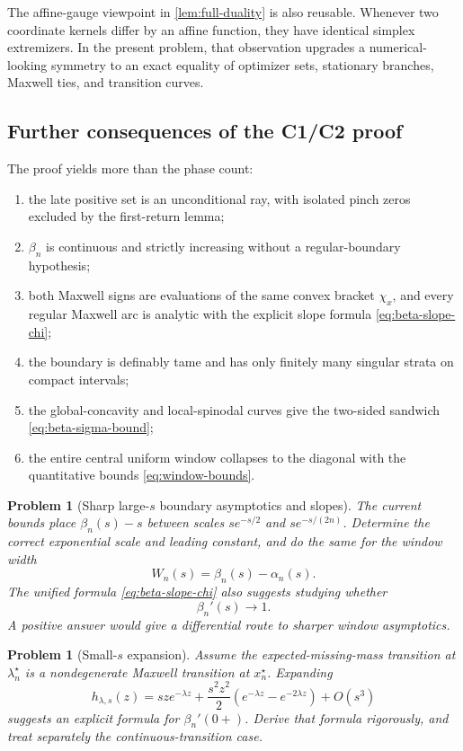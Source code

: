 \documentclass[11pt]{article}
\theoremstyle{plain}
\newtheorem{problem}[theorem]{Problem}
\theoremstyle{definition}
\theoremstyle{remark}
\begin{document}
The affine-gauge viewpoint in \cref{lem:full-duality} is also reusable.  Whenever two coordinate kernels differ by an affine function, they have identical simplex extremizers.  In the present problem, that observation upgrades a numerical-looking symmetry to an exact equality of optimizer sets, stationary branches, Maxwell ties, and transition curves.

\subsection{Further consequences of the C1/C2 proof}

The proof yields more than the phase count:
\begin{enumerate}[label=\textup{(\roman*)}]
\item the late positive set is an unconditional ray, with isolated pinch zeros excluded by the first-return lemma;
\item \(\beta_n\) is continuous and strictly increasing without a regular-boundary hypothesis;
\item both Maxwell signs are evaluations of the same convex bracket \(\chi_x\), and every regular Maxwell arc is analytic with the explicit slope formula \eqref{eq:beta-slope-chi};
\item the boundary is definably tame and has only finitely many singular strata on compact intervals;
\item the global-concavity and local-spinodal curves give the two-sided sandwich \eqref{eq:beta-sigma-bound};
\item the entire central uniform window collapses to the diagonal with the quantitative bounds \eqref{eq:window-bounds}.
\end{enumerate}

\begin{problem}[Sharp large-\(s\) boundary asymptotics and slopes]
The current bounds place \(\beta_n(s)-s\) between scales \(s e^{-s/2}\) and \(s e^{-s/(2n)}\).  Determine the correct exponential scale and leading constant, and do the same for the window width
\[
W_n(s)=\beta_n(s)-\alpha_n(s).
\]
The unified formula \eqref{eq:beta-slope-chi} also suggests studying whether
\[
\beta_n'(s)\longrightarrow1.
\]
A positive answer would give a differential route to sharper window asymptotics.
\end{problem}

\begin{problem}[Small-\(s\) expansion]
Assume the expected-missing-mass transition at \(\lambda_n^\star\) is a nondegenerate Maxwell transition at \(x_n^\star\).  Expanding
\[
h_{\lambda,s}(z)
=sze^{-\lambda z}
+\frac{s^2z^2}{2}\left(e^{-\lambda z}-e^{-2\lambda z}\right)
+O(s^3)
\]
suggests an explicit formula for \(\beta_n'(0+)\).  Derive that formula rigorously, and treat separately the continuous-transition case.
\end{problem}
\end{document}
